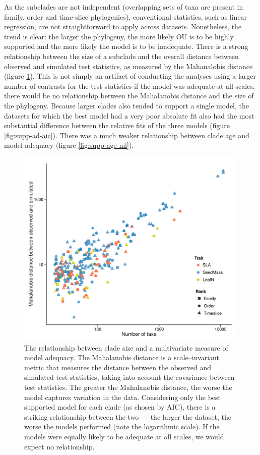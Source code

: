 As the subclades are not independent (overlapping sets of taxa are present in family, order and time-slice phylogenies), conventional statistics, such as linear regression, are not straightforward to apply across datasets. Nonetheless, the trend is clear: the larger the phylogeny, the more likely OU is to be highly supported and the more likely the model is to be inadequate. There is a strong relationship between the size of a subclade and the overall distance between observed and simulated test statistics, as measured by the Mahanalobis distance (figure \ref{fig:size-adequacy}). This is not simply an artifact of conducting the analyses using a larger number of contrasts for the test statistics-if the model was adequate at all scales, there would be no relationship between the Mahalanobis distance and the size of the phylogeny. Because larger clades also tended to support a single model, the datasets for which the best model had a very poor absolute fit also had the most substantial difference between the relative fits of the three models (figure \ref{fig:supp-ad-aic}). There was a much weaker relationship between clade age and model adequacy (figure \ref{fig:supp-age-ml}).

\begin{figure}[p]
  \centering
  \includegraphics[width=\textwidth]{figs/ad-size-ml}
  \caption[Model adequacy versus clade size (ML)]{The relationship between clade size and a multivariate measure of model adequacy. The Mahalanobis distance is a scale--invariant metric that measures the distance between the observed and simulated test statistics, taking into account the covariance between test statistics. The greater the Mahalanobis distance, the worse the model captures variation in the data. Considering only the best supported model for each clade (as chosen by AIC), there is a striking relationship between the two --- the larger the dataset, the worse the models performed (note the logarithmic scale). If the models were equally likely to be adequate at all scales, we would expect no relationship.}
  \label{fig:size-adequacy}
\end{figure}


